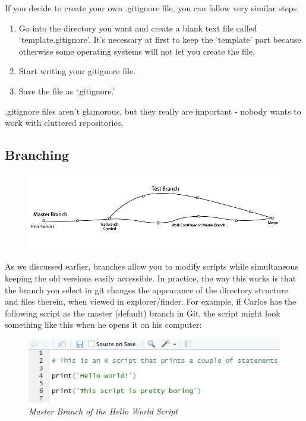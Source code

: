 \documentclass[]{book}
\begin{document}
If you decide to create your own .gitignore file, you can follow very
similar steps.

\begin{enumerate}
\def\labelenumi{\arabic{enumi}.}
\item
  Go into the directory you want and create a blank text file called
  `template.gitignore'. It's necessary at first to keep the `template'
  part because otherwise some operating systems will not let you create
  the file.
\item
  Start writing your gitignore file.
\item
  Save the file as `.gitignore.'
\end{enumerate}

.gitignore files aren't glamorous, but they really are important -
nobody wants to work with cluttered repositories.

\subsection{Branching}\label{branching}

\begin{figure}
\centering
\includegraphics{images/branchinggraphic.PNG}
\caption{}
\end{figure}

As we discussed earlier, branches allow you to modify scripts while
simultaneous keeping the old versions easily accessible. In practice,
the way this works is that the branch you select in git changes the
appearance of the directory structure and files therein, when viewed in
explorer/finder. For example, if Carlos has the following script as the
master (default) branch in Git, the script might look something like
this when he opens it on his computer:

\begin{figure}
\centering
\includegraphics{images/hello1.PNG}
\caption{\emph{Master Branch of the Hello World Script}}
\end{figure}
\end{document}
